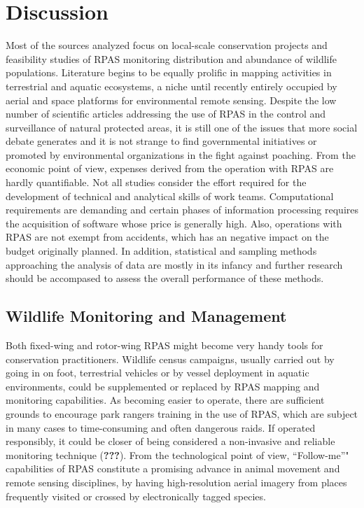 \documentclass[]{interact}
\theoremstyle{plain}%
\theoremstyle{definition}
\theoremstyle{remark}
\begin{document}
\section{Discussion}\label{discussion}

Most of the sources analyzed focus on local-scale conservation projects
and feasibility studies of RPAS monitoring distribution and abundance of
wildlife populations. Literature begins to be equally prolific in
mapping activities in terrestrial and aquatic ecosystems, a niche until
recently entirely occupied by aerial and space platforms for
environmental remote sensing. Despite the low number of scientific
articles addressing the use of RPAS in the control and surveillance of
natural protected areas, it is still one of the issues that more social
debate generates and it is not strange to find governmental initiatives
or promoted by environmental organizations in the fight against
poaching. From the economic point of view, expenses derived from the
operation with RPAS are hardly quantifiable. Not all studies consider
the effort required for the development of technical and analytical
skills of work teams. Computational requirements are demanding and
certain phases of information processing requires the acquisition of
software whose price is generally high. Also, operations with RPAS are
not exempt from accidents, which has an negative impact on the budget
originally planned. In addition, statistical and sampling methods
approaching the analysis of data are mostly in its infancy and further
research should be accompased to assess the overall performance of these
methods.

\subsection{Wildlife Monitoring and
Management}\label{wildlife-monitoring-and-management-1}

Both fixed-wing and rotor-wing RPAS might become very handy tools for
conservation practitioners. Wildlife census campaigns, usually carried
out by going in on foot, terrestrial vehicles or by vessel deployment in
aquatic environments, could be supplemented or replaced by RPAS mapping
and monitoring capabilities. As becoming easier to operate, there are
sufficient grounds to encourage park rangers training in the use of
RPAS, which are subject in many cases to time-consuming and often
dangerous raids. If operated responsibly, it could be closer of being
considered a non-invasive and reliable monitoring technique
({\textbf{???}}). From the technological point of view, ``Follow-me''"
capabilities of RPAS constitute a promising advance in animal movement
and remote sensing disciplines, by having high-resolution aerial imagery
from places frequently visited or crossed by electronically tagged
species.
\end{document}
